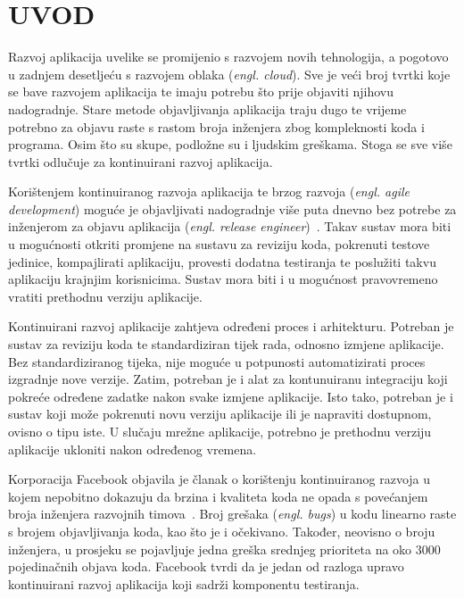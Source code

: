 \chapter{UVOD}
Razvoj aplikacija uvelike se promijenio s razvojem novih tehnologija, a pogotovo u zadnjem
desetljeću s razvojem oblaka (\textit{engl. cloud}). Sve je veći broj tvrtki koje se bave razvojem
aplikacija te imaju potrebu što prije objaviti njihovu nadogradnje. Stare metode objavljivanja
aplikacija traju dugo te vrijeme potrebno za objavu raste s rastom broja inženjera zbog kompleknosti
koda i programa. Osim što su skupe, podložne su i ljudskim greškama. Stoga se sve više tvrtki
odlučuje za kontinuirani razvoj aplikacija.

Korištenjem kontinuiranog razvoja aplikacija te brzog razvoja (\textit{engl. agile development})
moguće je objavljivati nadogradnje više puta dnevno bez potrebe za inženjerom za objavu aplikacija
(\textit{engl. release engineer})~\citep{abrahamsson2017agile}. Takav sustav mora biti u mogućnosti
otkriti promjene na sustavu za reviziju koda, pokrenuti testove jedinice, kompajlirati aplikaciju,
provesti dodatna testiranja te poslužiti takvu aplikaciju krajnjim korisnicima. Sustav mora biti i u
mogućnost pravovremeno vratiti prethodnu verziju aplikacije.

Kontinuirani razvoj aplikacije zahtjeva određeni proces i arhitekturu. Potreban je sustav za
reviziju koda te standardiziran tijek rada, odnosno izmjene aplikacije. Bez standardiziranog tijeka,
nije moguće u potpunosti automatizirati proces izgradnje nove verzije. Zatim, potreban je i alat za
kontunuiranu integraciju koji pokreće određene zadatke nakon svake izmjene aplikacije. Isto tako,
potreban je i sustav koji može pokrenuti novu verziju aplikacije ili je napraviti dostupnom, ovisno
o tipu iste. U slučaju mrežne aplikacije, potrebno je prethodnu verziju aplikacije ukloniti nakon
određenog vremena.

Korporacija Facebook objavila je članak o korištenju kontinuiranog razvoja u kojem nepobitno
dokazuju da brzina i kvaliteta koda ne opada s povećanjem broja inženjera razvojnih
timova~\citep{rossi2016continuous}. Broj grešaka (\textit{engl. bugs}) u kodu linearno raste s
brojem objavljivanja koda, kao što je i očekivano. Također, neovisno o broju inženjera, u prosjeku
se pojavljuje jedna greška srednjeg prioriteta na oko 3000 pojedinačnih objava koda. Facebook tvrdi
da je jedan od razloga upravo kontinuirani razvoj aplikacija koji sadrži komponentu testiranja.

